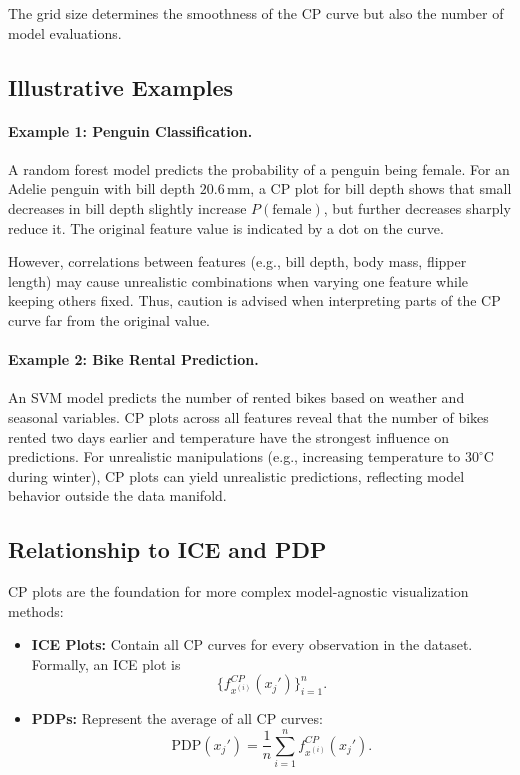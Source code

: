The grid size determines the smoothness of the CP curve but also the number of model evaluations.

\subsection{Illustrative Examples}

\paragraph{Example 1: Penguin Classification.}
A random forest model predicts the probability of a penguin being female.  
For an Adelie penguin with bill depth $20.6\,\mathrm{mm}$, a CP plot for bill depth shows that small decreases in bill depth slightly increase $P(\text{female})$, but further decreases sharply reduce it.  
The original feature value is indicated by a dot on the curve.

However, correlations between features (e.g., bill depth, body mass, flipper length) may cause unrealistic combinations when varying one feature while keeping others fixed.  
Thus, caution is advised when interpreting parts of the CP curve far from the original value.

\paragraph{Example 2: Bike Rental Prediction.}
An SVM model predicts the number of rented bikes based on weather and seasonal variables.  
CP plots across all features reveal that the number of bikes rented two days earlier and temperature have the strongest influence on predictions.  
For unrealistic manipulations (e.g., increasing temperature to $30^\circ$C during winter), CP plots can yield unrealistic predictions, reflecting model behavior outside the data manifold.

\subsection{Relationship to ICE and PDP}

CP plots are the foundation for more complex model-agnostic visualization methods:

\begin{itemize}
    \item \textbf{ICE Plots:} Contain all CP curves for every observation in the dataset.  
    Formally, an ICE plot is 
    \[
    \{ f^{CP}_{x^{(i)}}(x_j') \}_{i=1}^n.
    \]
    \item \textbf{PDPs:} Represent the average of all CP curves:
    \[
    \text{PDP}(x_j') = \frac{1}{n} \sum_{i=1}^n f^{CP}_{x^{(i)}}(x_j').
    \]
\end{itemize}

